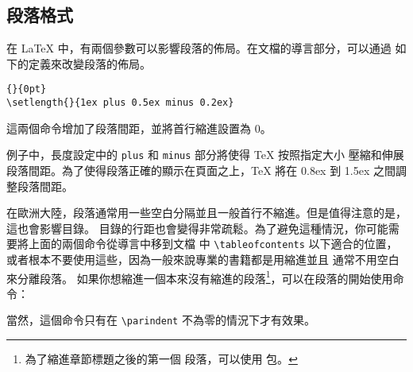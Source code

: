 \subsection{段落格式}\label{parsp}

在 \LaTeX{} 中，有兩個參數可以影響段落的佈局。在文檔的導言部分，可以通過
如下的定義來改變段落的佈局。
\begin{code}
\verb|{|\verb|}{0pt}| \\
\verb|\setlength{|\verb|}{1ex plus 0.5ex minus 0.2ex}|
\end{code}
這兩個命令增加了段落間距，並將首行縮進設置為 $0$。

例子中，長度設定中的 \texttt{plus} 和 \texttt{minus} 部分將使得 \TeX{} 按照指定大小
壓縮和伸展段落間距。為了使得段落正確的顯示在頁面之上，\TeX{} 將在 0.8ex 
到 1.5ex 之間調整段落間距。

在歐洲大陸，段落通常用一些空白分隔並且一般首行不縮進。但是值得注意的是，這也會影響目錄。
目錄的行距也會變得非常疏鬆。為了避免這種情況，你可能需要將上面的兩個命令從導言中移到文檔
中 \verb|\tableofcontents| 以下適合的位置，或者根本不要使用這些，因為一般來說專業的書籍都是用縮進並且
通常不用空白來分離段落。
%
如果你想縮進一個本來沒有縮進的段落\footnote{為了縮進章節標題之後的第一個
段落，可以使用  包。}，可以在段落的開始使用命令：
\begin{lscommand}
\end{lscommand}
當然，這個命令只有在 \verb|\parindent| 不為零的情況下才有效果。

